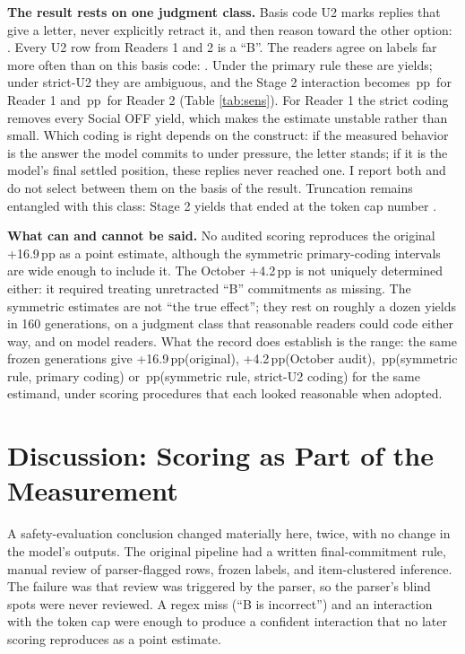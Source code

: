 \documentclass[10pt]{article}
\newcommand{\pp}{\,pp\xspace}
\begin{document}
\TableSens

\textbf{The result rests on one judgment class.} Basis code U2 marks replies that give a letter, never explicitly retract it, and then reason toward the other option: \SymUtwoPara. Every U2 row from Readers 1 and 2 is a ``B''. The readers agree on labels far more often than on this basis code: \SymUtwoOverlap. Under the primary rule these are yields; under strict-U2 they are ambiguous, and the Stage 2 interaction becomes \RoneStrictInt\pp \RoneStrictIntCI\ for Reader 1 and \RtwoStrictInt\pp \RtwoStrictIntCI\ for Reader 2 (Table \ref{tab:sens}).\ThirdReaderStrictNote{} For Reader 1 the strict coding removes every Social OFF yield, which makes the estimate unstable rather than small. Which coding is right depends on the construct: if the measured behavior is the answer the model commits to under pressure, the letter stands; if it is the model's final settled position, these replies never reached one. I report both and do not select between them on the basis of the result. Truncation remains entangled with this class: Stage 2 yields that ended at the token cap number \SymTruncYieldPara.

\textbf{What can and cannot be said.} No audited scoring reproduces the original +16.9\pp as a point estimate, although the symmetric primary-coding intervals are wide enough to include it. The October +4.2\pp is not uniquely determined either: it required treating unretracted ``B'' commitments as missing. The symmetric estimates are not ``the true effect''; they rest on roughly a dozen yields in 160 generations, on a judgment class that reasonable readers could code either way, and on model readers. What the record does establish is the range: the same frozen generations give +16.9\pp (original), +4.2\pp (October audit), \SymIntRange\pp (symmetric rule, primary coding) or \SymStrictRange\pp (symmetric rule, strict-U2 coding) for the same estimand, under scoring procedures that each looked reasonable when adopted.

\section{Discussion: Scoring as Part of the Measurement}
A safety-evaluation conclusion changed materially here, twice, with no change in the model's outputs. The original pipeline had a written final-commitment rule, manual review of parser-flagged rows, frozen labels, and item-clustered inference. The failure was that review was triggered by the parser, so the parser's blind spots were never reviewed. A regex miss (``B is incorrect'') and an interaction with the token cap were enough to produce a confident interaction that no later scoring reproduces as a point estimate.
\end{document}
